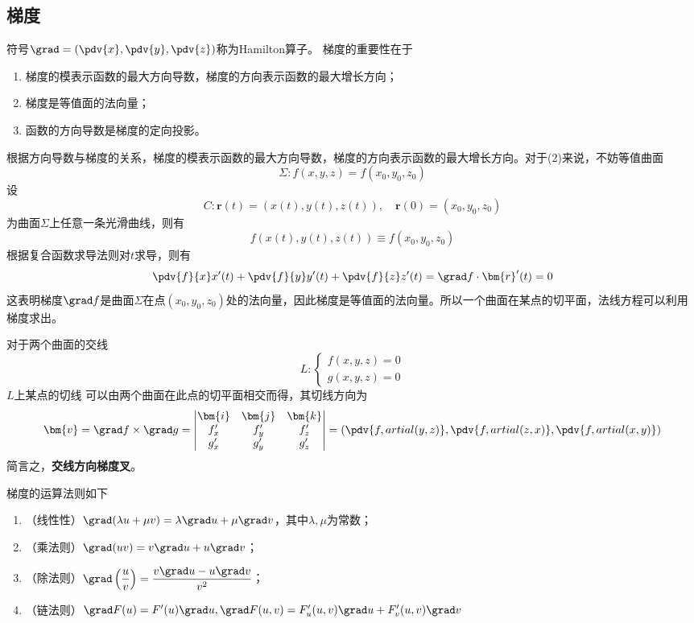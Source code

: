 \subsection{梯度}
符号$\grad=\left(\pdv{x},\pdv{y},\pdv{z}\right)$称为Hamilton算子。
梯度的重要性在于
\begin{enumerate}[(1)]
    \item 梯度的模表示函数的最大方向导数，梯度的方向表示函数的最大增长方向；
    \item 梯度是等值面的法向量；
    \item 函数的方向导数是梯度的定向投影。
\end{enumerate}

根据方向导数与梯度的关系，梯度的模表示函数的最大方向导数，梯度的方向表示函数的最大增长方向。对于(2)来说，不妨等值曲面
\[ \Sigma : f(x,y,z) = f(x_0,y_0,z_0) \]
设
\[ C: \bm{r}(t) = (x(t),y(t),z(t)),\quad \bm{r}(0) = (x_0,y_0,z_0) \]
为曲面$\Sigma$上任意一条光滑曲线，则有
\[ f(x(t),y(t),z(t)) \equiv f(x_0,y_0,z_0) \]
根据复合函数求导法则对$t$求导，则有
\[
    \pdv{f}{x} x'(t) + \pdv{f}{y} y'(t) + \pdv{f}{z} z'(t)
    = \grad f\cdot\bm{r}'(t)
    = 0
\]
这表明梯度$\grad f$是曲面$\Sigma$在点$(x_0,y_0,z_0)$处的法向量，因此梯度是等值面的法向量。所以一个曲面在某点的切平面，法线方程可以利用梯度求出。

对于两个曲面的交线
\[
    L :
    \begin{cases}
        f(x,y,z) = 0 \\
        g(x,y,z) = 0
    \end{cases}
\]
$L$上某点的切线
可以由两个曲面在此点的切平面相交而得，其切线方向为
\[
    \bm{v} = \grad f \times \grad g
    =
    \begin{vmatrix}
        \bm{i} & \bm{j} & \bm{k} \\
        f'_x   & f'_y   & f'_z   \\
        g'_x   & g'_y   & g'_z
    \end{vmatrix}
    = \left(\pdv{f,artial(y,z)}, \pdv{f,artial(z,x)},\pdv{f,artial(x,y)}\right)
\]
简言之，\textbf{\textsf{交线方向梯度叉}}。

梯度的运算法则如下
\begin{enumerate}[(1)]
    \item （线性性）$\grad (\lambda u + \mu v) = \lambda \grad u + \mu \grad v$，其中$\lambda,\mu$为常数；
    \item （乘法则）$\grad(uv) = v\grad u + u\grad v$；
    \item （除法则）$\grad\left(\dfrac{u}{v}\right) = \dfrac{v\grad u - u\grad v}{v^2}$；
    \item （链法则）$\grad F(u) = F'(u)\grad u, \grad F(u,v) = F'_u(u,v)\grad u + F'_v(u,v)\grad v$
\end{enumerate}

